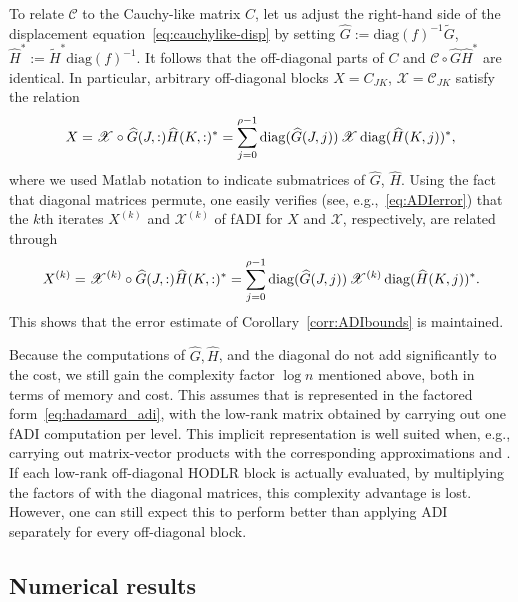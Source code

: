 \documentclass[final,reqno,onefignum,onetabnum]{siamart190516}
\begin{document}
To relate $\mathscr{C}$ to the Cauchy-like matrix $C$, let us adjust the right-hand side of the displacement equation~\eqref{eq:cauchylike-disp} by setting $\widehat G := \mathrm{diag}(f)^{-1} \widetilde G$,
$\widehat H^* := \widetilde{H}^* \mathrm{diag}(f)^{-1}$. It follows that the off-diagonal parts of $C$
and $\mathscr{C} \circ \widehat{G}\widehat{H}^*$ are identical. In particular, arbitrary off-diagonal blocks $X = C_{JK}$, 
$\mathscr{X} = \mathscr{C}_{JK}$ satisfy the relation
\begin{equation} 
\label{eq:hadamard_off}
X = \mathscr{X} \circ \widehat{G}(J,:) \widehat{H}(K,:)^* = \sum_{j = 0}^{\rho-1} {\rm diag}(\widehat G(J,  j))\, \mathscr{X} \,{\rm diag}(\widehat H(K , j))^*,
\end{equation}
where we used Matlab notation to indicate submatrices of $\widehat{G}$, $\widehat{H}$. Using the fact that diagonal matrices permute, one easily verifies (see, e.g.,~\eqref{eq:ADIerror}) that the $k$th iterates $X^{(k)}$ and $\mathscr{X}^{(k)}$ of fADI for $X$ and $\mathscr{X}$, respectively, are related through
\begin{equation} \label{eq:hadamard_adi}
 X^{(k)} = \mathscr{X}^{(k)} \circ \widehat{G}(J,:) \widehat{H}(K,:)^* = \sum_{j = 0}^{\rho-1} {\rm diag}(\widehat G(J,  j))\, \mathscr{X}^{(k)} \,{\rm diag}(\widehat H(K , j))^*.
\end{equation}
This shows that the error estimate of Corollary~\ref{corr:ADIbounds} is maintained.

Because the computations of $\widehat G, \widehat H$, and the diagonal do not add significantly to the cost, we still gain the complexity factor $\log n$ mentioned above, both in terms of memory and cost.
This assumes that  is represented in the factored form~\eqref{eq:hadamard_adi}, with the low-rank matrix obtained by carrying out one fADI computation per level.
This implicit representation is well suited when, e.g., carrying out matrix-vector products with the corresponding approximations  and . 
If each low-rank off-diagonal HODLR block  is actually evaluated, by multiplying the factors of with the diagonal matrices, this complexity advantage is lost. However, one can still expect this to perform
better than applying ADI separately for every off-diagonal block.





\subsection{Numerical results}
\end{document}
